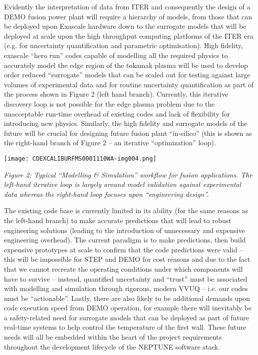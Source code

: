 \documentclass[a4paper]{article}
\begin{document}
\bigskip

Evidently the interpretation of data from ITER and consequently the design of a DEMO fusion power plant will require a
hierarchy of models, from those that can be deployed upon Exascale hardware down to the surrogate models that will be
deployed at scale upon the high throughput computing platforms of the ITER era (e.g. for uncertainty quantification and
parametric optimisation). High fidelity, exascale ``hero run'' codes capable of modelling all the required physics to
accurately model the edge region of the tokamak plasma will be used to develop order reduced ``surrogate'' models that
can be scaled out for testing against large volumes of experimental data and for routine uncertainty quantification as
part of the process shown in Figure 2 (left hand branch). Currently, this iterative discovery loop is not possible for
the edge plasma problem due to the unacceptable run-time overhead of existing codes and lack of flexibility for
introducing new physics. Similarly, the high fidelity and surrogate models of the future will be crucial for designing
future fusion plant ``in-silico'' (this is shown as the right-hand branch of Figure 2 -- an iterative ``optimization''
loop). 


\bigskip

{\centering  \texttt{[image: CDEXCALIBURFMS0001110WA-img004.png]} \par}

\bigskip

\textit{Figure 2: Typical ``Modelling \& Simulation'' workflow for fusion applications. The left-hand iterative loop is
largely around model validation against experimental data whereas the right-hand loop focuses upon ``engineering
design''.}


\bigskip

The existing code base is currently limited in its ability (for the same reasons as the left-hand branch) to make
accurate predictions that will lead to robust engineering solutions (leading to the introduction of unnecessary and
expensive engineering overhead). The current paradigm is to make predictions, then build expensive prototypes at scale
to confirm that the code predictions were valid -- this will be impossible for STEP and DEMO for cost reasons and due
to the fact that we cannot recreate the operating conditions under which components will have to survive -- instead,
quantified uncertainty and ``trust'' must be associated with modelling and simulation through rigorous, modern VVUQ --
i.e. our codes must be ``actionable''. Lastly, there are also likely to be additional demands upon code execution speed
from DEMO operation, for example there will inevitably be a safety-related need for surrogate models that can be
deployed as part of future real-time systems to help control the temperature of the first wall. These future needs will
all be embedded within the heart of the project requirements throughout the development lifecycle of the NEPTUNE
software stack. 
\end{document}
